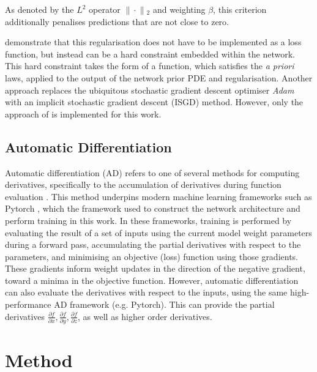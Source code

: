 \documentclass[manuscript.tex]{subfiles}
\begin{document}
As denoted by the \(L^2\) operator \(\lVert{}\cdot{}\rVert{}_{2}\) and weighting \(\beta{}\), this criterion additionally penalises predictions that are not close to zero.

\Textcite{sethiHardEnforcementPhysicsinformed2023} demonstrate that this regularisation does not have to be implemented as a loss function, but instead can be a hard constraint embedded within the network.
This hard constraint takes the form of a function, which satisfies the \emph{a priori} laws, applied to the output of the network prior PDE and regularisation.
Another approach \parencite{liImplicitStochasticGradient2023} replaces the ubiquitous stochastic gradient descent optimiser \emph{Adam} with an implicit stochastic gradient descent (ISGD) method.
However, only the approach of \textcite{benbarkaSeeingImplicitNeural2022} is implemented for this work.

\subsection{Automatic Differentiation}
Automatic differentiation (AD) refers to one of several methods for computing derivatives, specifically to the accumulation of derivatives during function evaluation \parencite{baydin2018automatic}.
This method underpins modern machine learning frameworks such as Pytorch \parencite{paszkePyTorchImperativeStyle2019}, which the framework used to construct the network architecture and perform training in this work.
In these frameworks, training is performed by evaluating the result of a set of inputs using the current model weight parameters during a forward pass, accumulating the partial derivatives with respect to the parameters, and minimising an objective (loss) function using those gradients.
These gradients inform weight updates in the direction of the negative gradient, toward a minima in the objective function.
However, automatic differentiation can also evaluate the derivatives with respect to the inputs, using the same high-performance AD framework (e.g. Pytorch).
This can provide the partial derivatives \(\frac{\partial f}{\partial x}, \frac{\partial f}{\partial y}, \frac{\partial f}{\partial z}\), as well as higher order derivatives.

\section{Method}
\end{document}
